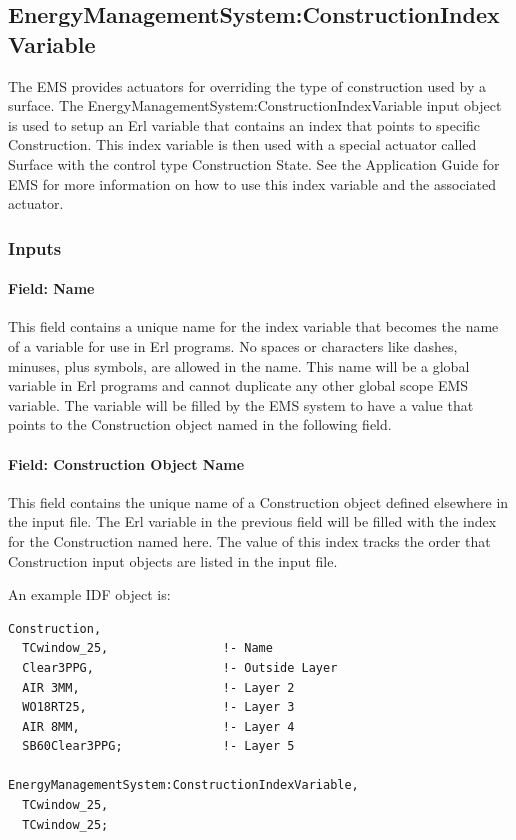 \subsection{EnergyManagementSystem:ConstructionIndexVariable}\label{energymanagementsystemconstructionindexvariable}

The EMS provides actuators for overriding the type of construction used by a surface. The EnergyManagementSystem:ConstructionIndexVariable input object is used to setup an Erl variable that contains an index that points to specific Construction. This index variable is then used with a special actuator called Surface with the control type Construction State. See the Application Guide for EMS for more information on how to use this index variable and the associated actuator.

\subsubsection{Inputs}\label{inputs-10-004}

\paragraph{Field: Name}\label{field-name-10-004}

This field contains a unique name for the index variable that becomes the name of a variable for use in Erl programs. No spaces or characters like dashes, minuses, plus symbols, are allowed in the name. This name will be a global variable in Erl programs and cannot duplicate any other global scope EMS variable. The variable will be filled by the EMS system to have a value that points to the Construction object named in the following field.

\paragraph{Field: Construction Object Name}\label{field-construction-object-name}

This field contains the unique name of a Construction object defined elsewhere in the input file. The Erl variable in the previous field will be filled with the index for the Construction named here. The value of this index tracks the order that Construction input objects are listed in the input file.

An example IDF object is:

\begin{lstlisting}
Construction,
  TCwindow_25,                !- Name
  Clear3PPG,                  !- Outside Layer
  AIR 3MM,                    !- Layer 2
  WO18RT25,                   !- Layer 3
  AIR 8MM,                    !- Layer 4
  SB60Clear3PPG;              !- Layer 5

EnergyManagementSystem:ConstructionIndexVariable,
  TCwindow_25,
  TCwindow_25;
\end{lstlisting}

